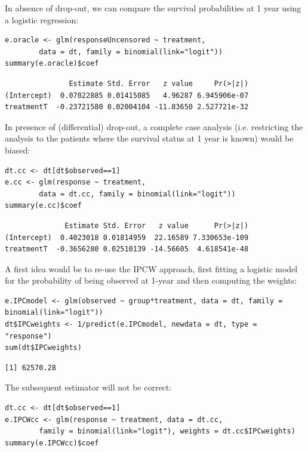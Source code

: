 \documentclass[12pt]{article}
\begin{document}
In absence of drop-out, we can compare the survival
probabilities at 1 year using a logistic regression:
\lstset{language=r,label= ,caption= ,captionpos=b,numbers=none}
\begin{lstlisting}
e.oracle <- glm(responseUncensored ~ treatment,
		data = dt, family = binomial(link="logit"))
summary(e.oracle)$coef
\end{lstlisting}

\begin{verbatim}
               Estimate Std. Error   z value     Pr(>|z|)
(Intercept)  0.07022885 0.01415085   4.96287 6.945906e-07
treatmentT  -0.23721580 0.02004104 -11.83650 2.527721e-32
\end{verbatim}


In presence of (differential) drop-out, a complete case analysis
(i.e. restricting the analysis to the patients where the survival
status at 1 year is known) would be biased:
\lstset{language=r,label= ,caption= ,captionpos=b,numbers=none}
\begin{lstlisting}
dt.cc <- dt[dt$observed==1]
e.cc <- glm(response ~ treatment,
	    data = dt.cc, family = binomial(link="logit"))
summary(e.cc)$coef
\end{lstlisting}

\begin{verbatim}
              Estimate Std. Error   z value      Pr(>|z|)
(Intercept)  0.4023018 0.01814959  22.16589 7.330653e-109
treatmentT  -0.3656280 0.02510139 -14.56605  4.618541e-48
\end{verbatim}


A first idea would be to re-use the IPCW approach, first fitting a
logistic model for the probability of being observed at 1-year and
then computing the weights:
\lstset{language=r,label= ,caption= ,captionpos=b,numbers=none}
\begin{lstlisting}
e.IPCmodel <- glm(observed ~ group*treatment, data = dt, family = binomial(link="logit"))
dt$IPCweights <- 1/predict(e.IPCmodel, newdata = dt, type = "response")
sum(dt$IPCweights)
\end{lstlisting}

\begin{verbatim}
[1] 62570.28
\end{verbatim}


The subsequent estimator will not be correct: 
\lstset{language=r,label= ,caption= ,captionpos=b,numbers=none}
\begin{lstlisting}
dt.cc <- dt[dt$observed==1]
e.IPCWcc <- glm(response ~ treatment, data = dt.cc,
		family = binomial(link="logit"), weights = dt.cc$IPCweights)
summary(e.IPCWcc)$coef
\end{lstlisting}
\end{document}
